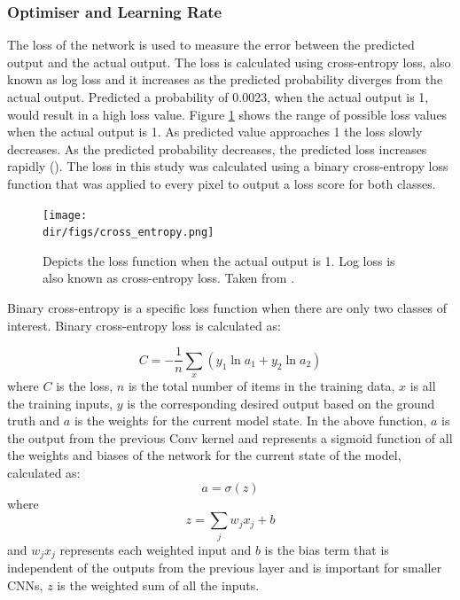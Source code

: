 \subsubsection{Optimiser and Learning Rate}
The loss of the network is used to measure the error between the predicted output and the actual output. The loss is calculated using cross-entropy loss, also known as log loss and it increases as the predicted probability diverges from the actual output. Predicted a probability of 0.0023, when the actual output is 1, would result in a high loss value. Figure \ref{fig.cross_entropy} shows the range of possible loss values when the actual output is 1. As predicted value approaches 1 the loss slowly decreases. As the predicted probability decreases, the predicted loss increases rapidly (\cite{Karpathy_opt}). The loss in this study was calculated using a binary cross-entropy loss function that was applied to every pixel to output a loss score for both classes.
\begin{figure}
    \centering
    \texttt{[image: \\dir/figs/cross\_entropy.png]}
    \caption[The Loss Function]{Depicts the loss function when the actual output is 1. Log loss is also known as cross-entropy loss. Taken from \citet{Karpathy_opt}.}
    \label{fig.cross_entropy}
\end{figure}
Binary cross-entropy is a specific loss function when there are only two classes of interest. Binary cross-entropy loss is calculated as:

\[C = -\frac{1}{n} \sum\limits_x (y_1 \ln a_1 + y_2 \ln a_2)\]
where $C$ is the loss, $n$ is the total number of items in the training data, $x$ is all the training inputs, $y$ is the corresponding desired output based on the ground truth and $a$ is the weights for the current model state. In the above function, $a$ is the output from the previous Conv kernel and represents a sigmoid function of all the weights and biases of the network for the current state of the model, calculated as: 
\[a =
\sigma(z)\]
where
\[z =
\sum_j w_j x_j+b\]
and $w_jx_j$ represents each weighted input and $b$ is the bias term that is independent of the outputs from the previous layer and is important for smaller CNNs, $z$ is the weighted sum of all the inputs. 


